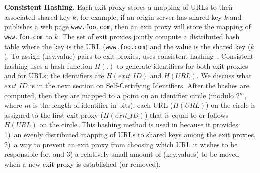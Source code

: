 \textbf{Consistent Hashing.}
Each exit proxy stores a mapping of URLs to their associated shared key $k$; for example, if 
an origin server has shared key $k$ and publishes a web page {\tt www.foo.com}, then an exit 
proxy will store the mapping of {\tt www.foo.com} to $k$.  The set of exit proxies jointly compute a distributed hash table where the key is the URL ({\tt www.foo.com}) and the value is the 
shared key ($k$).  To assign (key,value) pairs to exit proxies, \system{} uses consistent 
hashing~\cite{karger1997consistent,lewin1998consistent}.  Consistent hashing uses a hash function $H(.)$
to generate identifiers for both exit proxies and for URLs; the identifiers are $H(exit\_ID)$ and $H(URL)$. 
We discuss what $exit\_ID$ is in the next section on Self-Certifying Identifiers.  After the hashes are 
computed, then they are mapped to a point on an identifier circle (modulo 2$^{m}$, where $m$ is the length of 
identifier in bits); each URL ($H(URL)$) on the circle is assigned to the first exit proxy ($H(exit\_ID)$) that 
is equal to or follows $H(URL)$ on the circle.  This hashing method is used in \system{} because it provides: 
1)~an evenly distributed mapping of URLs to shared keys among the exit proxies,
2)~a way to prevent an exit 
proxy from choosing which URL it wishes to be responsible for, and 3) a relatively small amount 
of (key,values) to be moved when a new exit proxy is established (or removed).  


